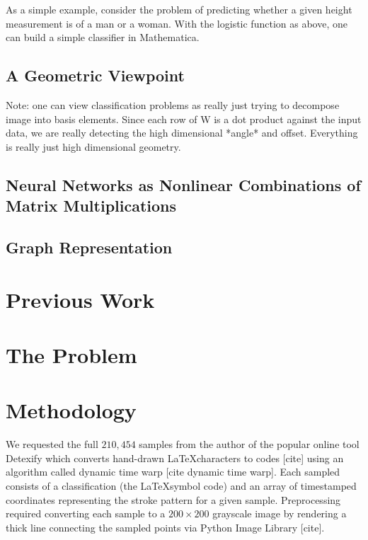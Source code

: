 \documentclass[12pt,letterpaper,boxed]{article}
\begin{document}
As a simple example, consider the problem of predicting whether a given height measurement is of a man or a woman. With the logistic function as above, one can build a simple classifier in Mathematica.


\subsection{A Geometric Viewpoint}


Note: one can view classification problems as really just trying to decompose image into basis elements. Since each row of W is a dot product against the input data, we are really detecting the high dimensional *angle* and offset. Everything is really just high dimensional geometry.

\subsection{Neural Networks as Nonlinear Combinations of Matrix Multiplications}

\subsection{Graph Representation}

\section{Previous Work}

\section{The Problem}

\section{Methodology}
We requested the full $210,454$ samples from the author of the popular online tool Detexify which converts hand-drawn \LaTeX characters to codes [cite] using an algorithm called dynamic time warp [cite dynamic time warp]. Each sampled consists of a classification (the \LaTeX symbol code) and an array of timestamped coordinates representing the stroke pattern for a given sample. Preprocessing required converting each sample to a $200 \times 200$ grayscale image by rendering a thick line connecting the sampled points via Python Image Library [cite]. 
\end{document}
